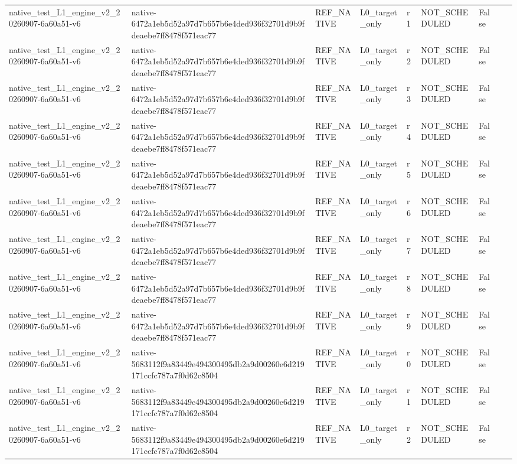 \begin{tabular}{lllllllll}
native\_test\_L1\_engine\_v2\_20260907-6a60a51-v6 & native-6472a1eb5d52a97d7b657b6e4ded936f32701d9b9fdeaebe7ff8478f571eac77 & REF\_NATIVE & L0\_target\_only & r1 & NOT\_SCHEDULED & False &  &  \\
native\_test\_L1\_engine\_v2\_20260907-6a60a51-v6 & native-6472a1eb5d52a97d7b657b6e4ded936f32701d9b9fdeaebe7ff8478f571eac77 & REF\_NATIVE & L0\_target\_only & r2 & NOT\_SCHEDULED & False &  &  \\
native\_test\_L1\_engine\_v2\_20260907-6a60a51-v6 & native-6472a1eb5d52a97d7b657b6e4ded936f32701d9b9fdeaebe7ff8478f571eac77 & REF\_NATIVE & L0\_target\_only & r3 & NOT\_SCHEDULED & False &  &  \\
native\_test\_L1\_engine\_v2\_20260907-6a60a51-v6 & native-6472a1eb5d52a97d7b657b6e4ded936f32701d9b9fdeaebe7ff8478f571eac77 & REF\_NATIVE & L0\_target\_only & r4 & NOT\_SCHEDULED & False &  &  \\
native\_test\_L1\_engine\_v2\_20260907-6a60a51-v6 & native-6472a1eb5d52a97d7b657b6e4ded936f32701d9b9fdeaebe7ff8478f571eac77 & REF\_NATIVE & L0\_target\_only & r5 & NOT\_SCHEDULED & False &  &  \\
native\_test\_L1\_engine\_v2\_20260907-6a60a51-v6 & native-6472a1eb5d52a97d7b657b6e4ded936f32701d9b9fdeaebe7ff8478f571eac77 & REF\_NATIVE & L0\_target\_only & r6 & NOT\_SCHEDULED & False &  &  \\
native\_test\_L1\_engine\_v2\_20260907-6a60a51-v6 & native-6472a1eb5d52a97d7b657b6e4ded936f32701d9b9fdeaebe7ff8478f571eac77 & REF\_NATIVE & L0\_target\_only & r7 & NOT\_SCHEDULED & False &  &  \\
native\_test\_L1\_engine\_v2\_20260907-6a60a51-v6 & native-6472a1eb5d52a97d7b657b6e4ded936f32701d9b9fdeaebe7ff8478f571eac77 & REF\_NATIVE & L0\_target\_only & r8 & NOT\_SCHEDULED & False &  &  \\
native\_test\_L1\_engine\_v2\_20260907-6a60a51-v6 & native-6472a1eb5d52a97d7b657b6e4ded936f32701d9b9fdeaebe7ff8478f571eac77 & REF\_NATIVE & L0\_target\_only & r9 & NOT\_SCHEDULED & False &  &  \\
native\_test\_L1\_engine\_v2\_20260907-6a60a51-v6 & native-5683112f9a83449e494300495db2a9d00260e6d219171ccfc787a7f0d62c8504 & REF\_NATIVE & L0\_target\_only & r0 & NOT\_SCHEDULED & False &  &  \\
native\_test\_L1\_engine\_v2\_20260907-6a60a51-v6 & native-5683112f9a83449e494300495db2a9d00260e6d219171ccfc787a7f0d62c8504 & REF\_NATIVE & L0\_target\_only & r1 & NOT\_SCHEDULED & False &  &  \\
native\_test\_L1\_engine\_v2\_20260907-6a60a51-v6 & native-5683112f9a83449e494300495db2a9d00260e6d219171ccfc787a7f0d62c8504 & REF\_NATIVE & L0\_target\_only & r2 & NOT\_SCHEDULED & False &  &  \\

\end{tabular}
